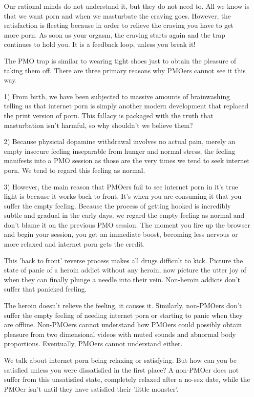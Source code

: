 Our rational minds do not understand it, but they do not need to. All we know is that we want porn and when we masturbate the craving goes. However, the satisfaction is fleeting because in order to relieve the craving you have to get more porn. As soon as your orgasm, the craving starts again and the trap continues to hold you. It is a feedback loop, unless you break it!

The PMO trap is similar to wearing tight shoes just to obtain the pleasure of taking them off. There are three primary reasons why PMOers cannot see it this way.

1) From birth, we have been subjected to massive amounts of brainwashing telling us that internet porn is simply another modern development that replaced the print version of porn. This fallacy is packaged with the truth that masturbation isn't harmful, so why shouldn't we believe them?

2) Because physicial dopamine withdrawal involves no actual pain, merely an empty insecure feeling inseparable from hunger and normal stress, the feeling manifests into a PMO session as those are the very times we tend to seek internet porn. We tend to regard this feeling as normal.

3) However, the main reason that PMOers fail to see internet porn in it's true light is because it works back to front. It's when you are  consuming it that you suffer the empty feeling. Because the process of getting hooked is incredibly subtle and gradual in the early days, we regard the empty feeling as normal and don't blame it on the previous PMO session. The moment you fire up the browser and begin your session, you get an immediate boost, becoming less nervous or more relaxed and internet porn gets the credit.

This 'back to front' reverse process makes all drugs difficult to kick. Picture the state of panic of a heroin addict without any heroin, now picture the utter joy of when they can finally plunge a needle into their vein. Non-heroin addicts don't suffer that panicked feeling.

The heroin doesn't relieve the feeling, it causes it. Similarly, non-PMOers don't suffer the empty feeling of needing internet porn or starting to panic when they are offline. Non-PMOers cannot understand how PMOers could possibly obtain pleasure from two dimensional videos with muted sounds and abnormal body proportions. Eventually, PMOers cannot understand either.

We talk about internet porn being relaxing or satisfying. But how can you be satisfied unless you were dissatisfied in the first place? A non-PMOer does not suffer from this unsatisfied state, completely relaxed after a no-sex date, while the PMOer isn't until they have satisfied their 'little monster'.

